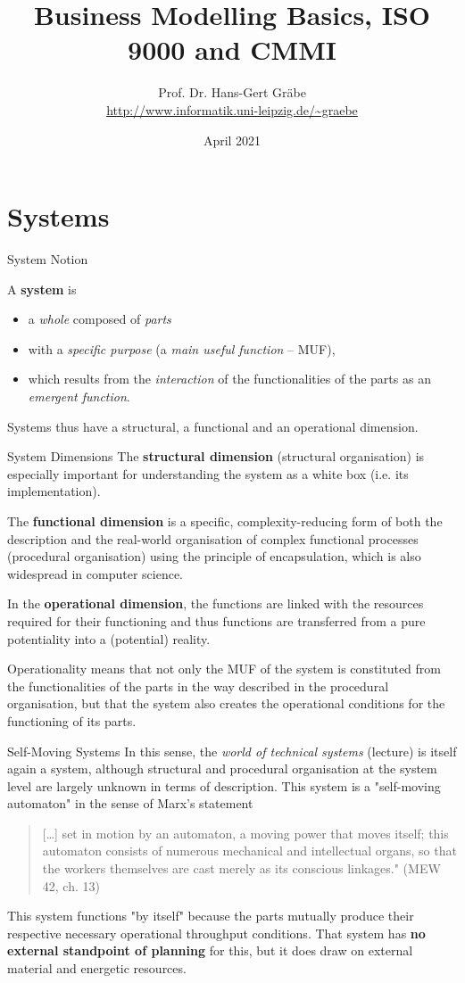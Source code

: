 \documentclass{beamer}
\title{Business Modelling Basics, ISO 9000 and CMMI}
\author{Prof. Dr. Hans-Gert Gräbe\\
\url{http://www.informatik.uni-leipzig.de/~graebe}}
\date{April 2021}
\begin{document}
{
\begin{frame}
  \titlepage
\end{frame}}

\section{Systems}
\begin{frame}{System Notion}

A \textbf{system} is 
\begin{itemize}
\item a \emph{whole} composed of \emph{parts} 
\item with a \emph{specific purpose} (a \emph{main useful function} -- MUF),
\item which results from the \emph{interaction} of the functionalities of the
  parts as an \emph{emergent function}.
\end{itemize}
Systems thus have a structural, a functional and an operational dimension.
\end{frame}

\begin{frame}{System Dimensions}
The \textbf{structural dimension} (structural organisation) is especially
important for understanding the system as a white box (i.e. its
implementation).

The \textbf{functional dimension} is a specific, complexity-reducing form of
both the description and the real-world organisation of complex functional
processes (procedural organisation) using the principle of encapsulation,
which is also widespread in computer science.

In the \textbf{operational dimension}, the functions are linked with
the resources required for their functioning and thus functions are
transferred from a pure potentiality into a (potential) reality.

Operationality means that not only the MUF of the system is constituted from
the functionalities of the parts in the way described in the procedural
organisation, but that the system also creates the operational conditions for
the functioning of its parts.
\end{frame}


\begin{frame}{Self-Moving Systems}
In this sense, the \emph{world of technical systems} (lecture) is itself again
a system, although structural and procedural organisation at the system level
are largely unknown in terms of description. This system is a "self-moving
automaton" in the sense of Marx's statement 
\begin{quote}
  [\ldots] set in motion by an automaton, a moving power that moves itself;
  this automaton consists of numerous mechanical and intellectual organs, so
  that the workers themselves are cast merely as its conscious linkages." (MEW
  42, ch. 13)
\end{quote}
This system functions "by itself" because the parts mutually produce their
respective necessary operational throughput conditions. That system has
\textbf{no external standpoint of planning} for this, but it does draw on
external material and energetic resources.
\end{frame}
\end{document}
